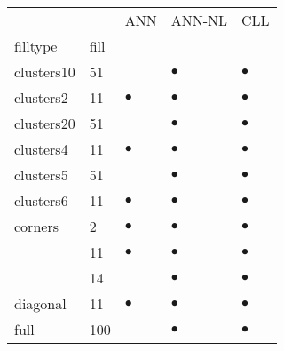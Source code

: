 \begin{tabular}{lllll}
\toprule
     &     &        ANN &     ANN-NL &        CLL \\
filltype & fill &            &            &            \\
\midrule
clusters10 & 51  &            &  $\bullet$ &  $\bullet$ \\[2.0ex]
clusters2 & 11  &  $\bullet$ &  $\bullet$ &  $\bullet$ \\[2.0ex]
clusters20 & 51  &            &  $\bullet$ &  $\bullet$ \\[2.0ex]
clusters4 & 11  &  $\bullet$ &  $\bullet$ &  $\bullet$ \\[2.0ex]
clusters5 & 51  &            &  $\bullet$ &  $\bullet$ \\[2.0ex]
clusters6 & 11  &  $\bullet$ &  $\bullet$ &  $\bullet$ \\[2.0ex]
corners & 2   &  $\bullet$ &  $\bullet$ &  $\bullet$ \\
     & 11  &  $\bullet$ &  $\bullet$ &  $\bullet$ \\
     & 14  &            &  $\bullet$ &  $\bullet$ \\[2.0ex]
diagonal & 11  &  $\bullet$ &  $\bullet$ &  $\bullet$ \\
full & 100 &            &  $\bullet$ &  $\bullet$ \\
\bottomrule
\end{tabular}
